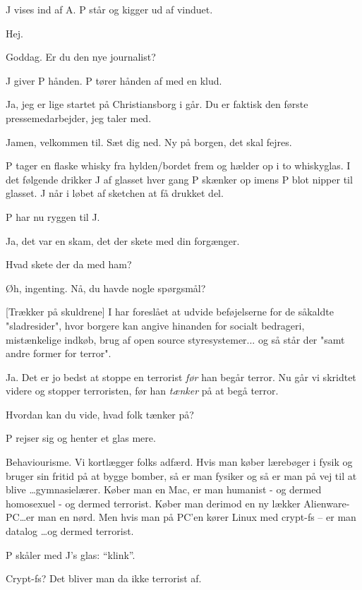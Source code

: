 \documentclass[a4paper,11pt]{article}
\begin{document}
\begin{sketch}

\scene J vises ind af A. P står og kigger ud af vinduet.

 Hej.

 Goddag. Er du den nye journalist?

\scene J giver P hånden. P tører hånden af med en klud.

 Ja, jeg er lige startet på Christiansborg i går. Du er
faktisk den første pressemedarbejder, jeg taler med.

 Jamen, velkommen til. Sæt dig ned. 
Ny på borgen, det skal fejres.

\scene P tager en flaske whisky fra hylden/bordet frem og hælder op i
to whiskyglas. I det følgende drikker J af glasset hver gang P
skænker op imens P blot nipper til glasset. J når i løbet af sketchen
at få drukket del.

\scene P har nu ryggen til J.

Ja, det var en skam, det der skete med din forgænger.

Hvad skete der da med ham?

Øh, ingenting. Nå, du havde nogle spørgsmål?

[Trækker på skuldrene] I har foreslået at udvide beføjelserne
for de såkaldte "sladresider", hvor borgere kan angive hinanden for
socialt bedrageri, mistænkelige indkøb, brug af open source
styresystemer... og så står der "samt andre former for terror".

Ja. Det er jo bedst at stoppe en terrorist \textit{før} han
begår terror. Nu går vi skridtet videre og stopper terroristen, før
han \textit{tænker} på at begå terror.

Hvordan kan du vide, hvad folk tænker på?

\scene P rejser sig og henter et glas mere.

Behaviourisme. Vi kortlægger folks adfærd. Hvis man køber
lærebøger i fysik og bruger sin fritid på at bygge bomber, så er man
fysiker og så er man på vej til at blive \ldots gymnasielærer. Køber
man en Mac, er man humanist - og dermed homosexuel - og dermed
terrorist. Køber man derimod en ny lækker Alienware-PC\ldots er man en
nørd. Men hvis man på PC'en kører Linux med crypt-fs -- er man datalog
\ldots og dermed terrorist.

\scene P skåler med J's glas: ``klink''.

Crypt-fs? Det bliver man da ikke terrorist af.


\end{sketch}
\end{document}
